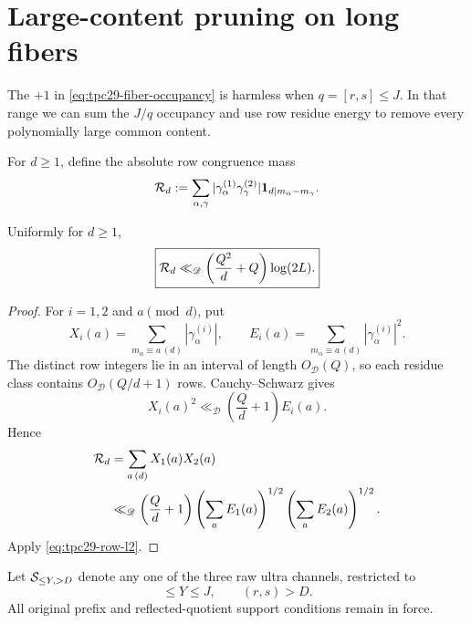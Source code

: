 \section{Large-content pruning on long fibers}
\label{sec:tpc29-long-content}

The $+1$ in \eqref{eq:tpc29-fiber-occupancy} is harmless when
$q=[r,s]\le J$.  In that range we can sum the $J/q$ occupancy and use
row residue energy to remove every polynomially large common content.

For $d\ge1$, define the absolute row congruence mass
\begin{equation}
 \mathcal R_d
 :=\sum_{\alpha,\gamma}
 |\gamma_\alpha^{(1)}\gamma_\gamma^{(2)}|
 \mathbf 1_{d\mid m_\alpha-m_\gamma}.
 \label{eq:tpc29-row-congruence-mass}
\end{equation}

\begin{lemma}
\label{lem:tpc29-row-residue-energy}
Uniformly for $d\ge1$,
\begin{equation}
 \boxed{
 \mathcal R_d\ll_{\mathscr D}
 \left(\frac{Q^2}{d}+Q\right)\log(2L).}
 \label{eq:tpc29-row-residue-bound}
\end{equation}
\end{lemma}

\begin{proof}
For $i=1,2$ and $a\pmod d$, put
\[
 X_i(a)=\sum_{m_\alpha\equiv a\, (d)}|\gamma_\alpha^{(i)}|,
 \qquad
 E_i(a)=\sum_{m_\alpha\equiv a\, (d)}|\gamma_\alpha^{(i)}|^2.
\]
The distinct row integers lie in an interval of length
$O_{\mathscr D}(Q)$, so each residue class contains
$O_{\mathscr D}(Q/d+1)$ rows.  Cauchy--Schwarz gives
\[
 X_i(a)^2\ll_{\mathscr D}\left(\frac Qd+1\right)E_i(a).
\]
Hence
\begin{align*}
 \mathcal R_d
 &=\sum_{a\, (d)}X_1(a)X_2(a)\\
 &\ll_{\mathscr D}\left(\frac Qd+1\right)
 \left(\sum_aE_1(a)\right)^{1/2}
 \left(\sum_aE_2(a)\right)^{1/2}.
\end{align*}
Apply \eqref{eq:tpc29-row-l2}.
\end{proof}

Let $\mathcal S_{\le Y,>D}$ denote any one of the three raw ultra channels,
restricted to
\begin{equation}
 [r,s]\le Y\le J,
 \qquad
 (r,s)>D.
 \label{eq:tpc29-long-content-region}
\end{equation}
All original prefix and reflected-quotient support conditions remain
in force.

